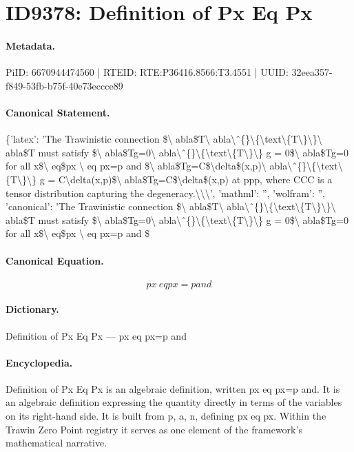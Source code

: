 \section*{ID9378: Definition of Px Eq Px}
\paragraph{Metadata.}
PiID: 6670944474560 | RTEID: RTE:P36416.8566:T3.4551 | UUID: 32eea357-f849-53fb-b75f-40e73eccce89

\paragraph{Canonical Statement.}
\{'latex': 'The Trawinistic connection \$\textbackslash{} abla\$T\textbackslash{} abla\textbackslash{}ˆ\{\}\textbackslash{}\{\textbackslash{}text\textbackslash{}\{T\textbackslash{}\}\textbackslash{}\}\textbackslash{} abla\$T must satisfy \$\textbackslash{} abla\$Tg=0\textbackslash{} abla\textbackslash{}ˆ\{\}\textbackslash{}\{\textbackslash{}text\textbackslash{}\{T\textbackslash{}\}\textbackslash{}\} g = 0\$\textbackslash{} abla\$Tg=0 for all x\$\textbackslash{} eq\$px \textbackslash{} eq px=p and \$\textbackslash{} abla\$Tg=C\$\textbackslash{}delta\$(x,p)\textbackslash{} abla\textbackslash{}ˆ\{\}\textbackslash{}\{\textbackslash{}text\textbackslash{}\{T\textbackslash{}\}\textbackslash{}\} g = C\textbackslash{}delta(x,p)\$\textbackslash{} abla\$Tg=C\$\textbackslash{}delta\$(x,p) at ppp, where CCC is a tensor distribution capturing the degeneracy.\textbackslash{}\textbackslash{}\textbackslash{}', 'mathml': '', 'wolfram': '', 'canonical': 'The Trawinistic connection \$\textbackslash{} abla\$T\textbackslash{} abla\textbackslash{}ˆ\{\}\textbackslash{}\{\textbackslash{}text\textbackslash{}\{T\textbackslash{}\}\textbackslash{}\}\textbackslash{} abla\$T must satisfy \$\textbackslash{} abla\$Tg=0\textbackslash{} abla\textbackslash{}ˆ\{\}\textbackslash{}\{\textbackslash{}text\textbackslash{}\{T\textbackslash{}\}\textbackslash{}\} g = 0\$\textbackslash{} abla\$Tg=0 for all x\$\textbackslash{} eq\$px \textbackslash{} eq px=p and \$

\paragraph{Canonical Equation.}
\[
px \ eq px=p and
\]

\paragraph{Dictionary.}
Definition of Px Eq Px — px eq px=p and

\paragraph{Encyclopedia.}
Definition of Px Eq Px is an algebraic definition, written px eq px=p and. It is an algebraic definition expressing the quantity directly in terms of the variables on its right-hand side. It is built from p, a, n, defining px eq px. Within the Trawin Zero Point registry it serves as one element of the framework's mathematical narrative.
